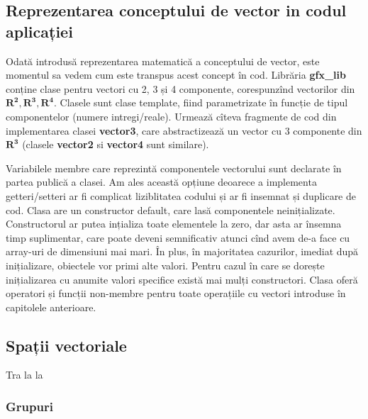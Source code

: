 \subsection{Reprezentarea conceptului de vector in codul aplicației}
\label{ch1:sec_vectors:sub_vector_cpp_impl}
\indent

Odată introdusă reprezentarea matematică a conceptului de vector, este momentul
sa vedem cum este transpus acest concept în cod. Librăria \textbf{gfx\_lib}
conține clase pentru vectori cu 2, 3 și 4 componente, corespunzînd vectorilor
din $\mathbf{R^2, R^3, R^4}$. Clasele sunt clase template, fiind parametrizate
în funcție de tipul componentelor (numere intregi/reale).
Urmează cîteva fragmente de cod din implementarea clasei \textbf{vector3}, care
abstractizează un vector cu 3 componente din $\mathbf{R^3}$ (clasele
\textbf{vector2} si \textbf{vector4} sunt similare).



Variabilele membre care reprezintă componentele vectorului sunt declarate în
partea publică a clasei. Am ales această opțiune deoarece a implementa
getteri/setteri ar fi complicat liziblitatea codului și ar fi insemnat 
și duplicare de cod. Clasa are un constructor default, care lasă componentele
neinițializate. Constructorul ar putea ințializa toate elementele la zero, dar
asta ar însemna timp suplimentar, care poate deveni semnificativ atunci cînd 
avem de-a face cu array-uri de dimensiuni mai mari. În plus, în majoritatea
cazurilor, imediat după inițializare, obiectele vor primi alte valori. Pentru
cazul în care se dorește inițializarea cu anumite valori specifice există mai mulți
constructori. Clasa oferă operatori și funcții non-membre pentru toate
operațiile cu vectori introduse în capitolele anterioare.

\subsection{Spații vectoriale}
\label{ch1:sec_vectors:sub_vector_spaces}
Tra la la
\subsubsection{Grupuri}
\label{ch1:sec_vectors:sub_vector_spaces:sub_sub_groups}
\indent

